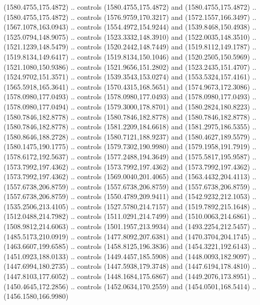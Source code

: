 \begin{scope}[shift={(-22.88722,-49.76189)}]
\begin{scope}[shift={(-739.46591,328.36782)}]
      (1580.4755,175.4872) .. controls (1580.4755,175.4872) and (1580.4755,175.4872)
      .. (1580.4755,175.4872) .. controls (1576.9759,170.3217) and
      (1572.1557,166.3497) .. (1567.1078,163.0943) .. controls (1554.4972,154.9244)
      and (1539.8468,150.4938) .. (1525.0794,148.9075) .. controls
      (1523.3332,148.3910) and (1522.0035,148.3510) .. (1521.1239,148.5479) ..
      controls (1520.2442,148.7449) and (1519.8112,149.1787) .. (1519.8134,149.6417)
      .. controls (1519.8134,150.1046) and (1520.2505,150.5969) ..
      (1521.1080,150.9386) .. controls (1521.9656,151.2802) and (1523.2435,151.4707)
      .. (1524.9702,151.3571) .. controls (1539.3543,153.0274) and
      (1553.5324,157.4161) .. (1565.5918,165.3641) .. controls (1570.4315,168.5651)
      and (1574.9673,172.3086) .. (1578.0980,177.0493) .. controls
      (1578.0980,177.0493) and (1578.0980,177.0493) .. (1578.0980,177.0494) ..
      controls (1579.3000,178.8701) and (1580.2824,180.8223) .. (1580.7846,182.8778)
      .. controls (1580.7846,182.8778) and (1580.7846,182.8778) ..
      (1580.7846,182.8778) .. controls (1581.2209,184.6618) and (1581.2975,186.5355)
      .. (1580.8646,188.2728) .. controls (1580.7121,188.9237) and
      (1580.4627,189.5579) .. (1580.1475,190.1775) .. controls (1579.7302,190.9980)
      and (1579.1958,191.7919) .. (1578.6172,192.5637) .. controls
      (1577.2488,194.3649) and (1575.5817,195.9587) .. (1573.7992,197.4362) ..
      controls (1573.7992,197.4362) and (1573.7992,197.4362) .. (1573.7992,197.4362)
      .. controls (1569.0040,201.4065) and (1563.4432,204.4113) ..
      (1557.6738,206.8759) .. controls (1557.6738,206.8759) and (1557.6738,206.8759)
      .. (1557.6738,206.8759) .. controls (1550.4789,209.9411) and
      (1542.9232,212.1053) .. (1535.2506,213.4105) .. controls (1527.5780,214.7157)
      and (1519.7892,215.1648) .. (1512.0488,214.7982) .. controls
      (1511.0291,214.7499) and (1510.0063,214.6861) .. (1508.9812,214.6063) ..
      controls (1501.1957,213.9934) and (1493.2254,212.5457) .. (1485.5173,210.0919)
      .. controls (1477.8092,207.6381) and (1470.3704,204.1745) ..
      (1463.6607,199.6585) .. controls (1458.8125,196.3836) and (1454.3221,192.6143)
      .. (1451.0923,188.0133) .. controls (1449.4457,185.5908) and
      (1448.0093,182.9097) .. (1447.6994,180.2735) .. controls (1447.5938,179.3748)
      and (1447.6194,178.4810) .. (1447.8103,177.6052) .. controls
      (1448.1684,175.6867) and (1449.2076,173.8951) .. (1450.4645,172.2856) ..
      controls (1452.0634,170.2559) and (1454.0501,168.5414) .. (1456.1580,166.9980)

\end{scope}
\end{scope}
